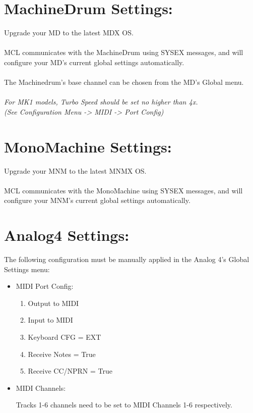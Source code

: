 \section{MachineDrum Settings:}
Upgrade your MD to the latest MDX OS.\\\\
MCL communicates with the MachineDrum using SYSEX messages, and will configure your MD's current global settings automatically.
\\\\The Machinedrum's base channel can be chosen from the MD's Global menu.\\\\
\textit{For MK1 models, Turbo Speed should be set no higher than 4x.\\(See Configuration Menu -> MIDI -> Port Config)}
\section{MonoMachine Settings:}
Upgrade your MNM to the latest MNMX OS.\\\\
MCL communicates with the MonoMachine using SYSEX messages, and will configure your MNM's current global settings automatically.
\section{Analog4 Settings:}

The following configuration must be manually applied in the Analog 4's Global Settings menu:

\begin{itemize}

\item{MIDI Port Config:}
\begin{enumerate}
\item{Output to MIDI}
\item{Input to MIDI}
\item{Keyboard CFG = EXT}
\item{Receive Notes = True}
\item{Receive CC/NPRN = True}
\end{enumerate}
\item{MIDI Channels:}

Tracks 1-6 channels need to be set to MIDI Channels 1-6 respectively.

\end{itemize}
